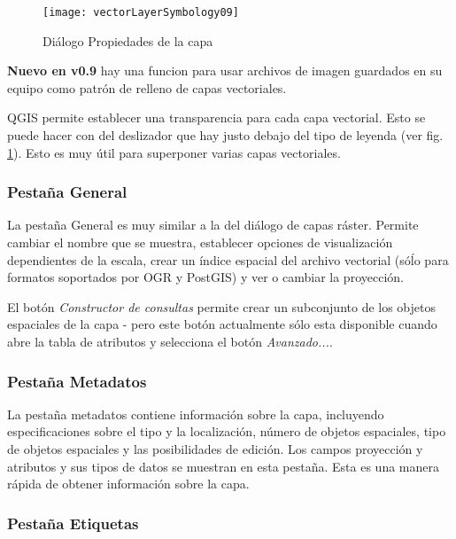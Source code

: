 \begin{figure}[H]
   \begin{center}
   \caption{Diálogo Propiedades de la capa}\label{fig:vector_symbology}\smallskip
   \texttt{[image: vectorLayerSymbology09]} 
\end{center}  
\end{figure}

\textbf{Nuevo en v0.9} hay una funcion para usar archivos de imagen guardados en su equipo como patrón de relleno de capas vectoriales.

 \label{sec:vect_transparency} 
QGIS \CURRENT permite establecer una transparencia para cada capa vectorial. Esto se puede hacer con del deslizador que hay justo debajo del tipo de leyenda (ver fig. \ref{fig:vector_symbology}). Esto es muy útil para superponer varias capas vectoriales.

\subsubsection{Pestaña General}
La pestaña General es muy similar a la del diálogo de capas ráster. Permite cambiar el nombre que se muestra, establecer opciones de visualización dependientes de la escala, crear un índice espacial del archivo vectorial (sóĺo para formatos soportados por OGR y PostGIS) y ver o cambiar la proyección.

El botón \textsl{Constructor de consultas} permite crear un subconjunto de los objetos espaciales de la capa - pero este botón actualmente sólo esta disponible cuando abre la tabla de atributos y selecciona el botón \textsl{Avanzado...}.

\subsubsection{Pestaña Metadatos}

La pestaña metadatos contiene información sobre la capa, incluyendo especificaciones sobre el tipo y la localización, número de objetos espaciales, tipo de objetos espaciales y las posibilidades de edición. Los campos proyección y atributos y sus tipos de datos se muestran en esta pestaña. Esta es una manera rápida de obtener información sobre la capa.

\subsubsection{Pestaña Etiquetas}

